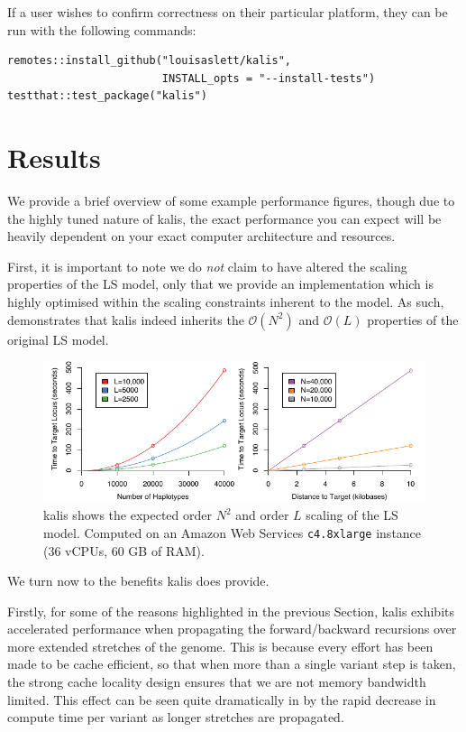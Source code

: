 \documentclass[pdflatex,referee,lineno,sn-nature]{sn-jnl}%
\newcommand{\pkg}[1]{{\fontseries{m}\fontseries{b}\selectfont #1}}
\begin{document}
If a user wishes to confirm correctness on their particular platform, they can be run with the following commands:

\begin{verbatim}
remotes::install_github("louisaslett/kalis",
                        INSTALL_opts = "--install-tests")
testthat::test_package("kalis")
\end{verbatim}


\section*{Results}
\label{sec:perf}

We provide a brief overview of some example performance figures, though due to the highly tuned nature of \pkg{kalis}, the exact performance you can expect will be heavily dependent on your exact computer architecture and resources.

First, it is important to note we do \emph{not} claim to have altered the scaling properties of the LS model, only that we provide an implementation which is highly optimised within the scaling constraints inherent to the model.
As such,  demonstrates that \pkg{kalis} indeed inherits the \(\mathcal{O}(N^2)\) and \(\mathcal{O}(L)\) properties of the original LS model.

\begin{figure}
  \centering
  \includegraphics{fig2}
	\caption{
	  \pkg{kalis} shows the expected order $N^2$ and order $L$ scaling of the LS model.
	  Computed on an Amazon Web Services \texttt{c4.8xlarge} instance (36 vCPUs, 60 GB of RAM).
	}
	\label{fig:perfscaling}
\end{figure}

We turn now to the benefits \pkg{kalis} does provide.

Firstly, for some of the reasons highlighted in the previous Section, \pkg{kalis} exhibits accelerated performance when propagating the forward/backward recursions over more extended stretches of the genome.
This is because every effort has been made to be cache efficient, so that when more than a single variant step is taken, the strong cache locality design ensures that we are not memory bandwidth limited.
This effect can be seen quite dramatically in  by the rapid decrease in compute time per variant as longer stretches are propagated.
\end{document}
